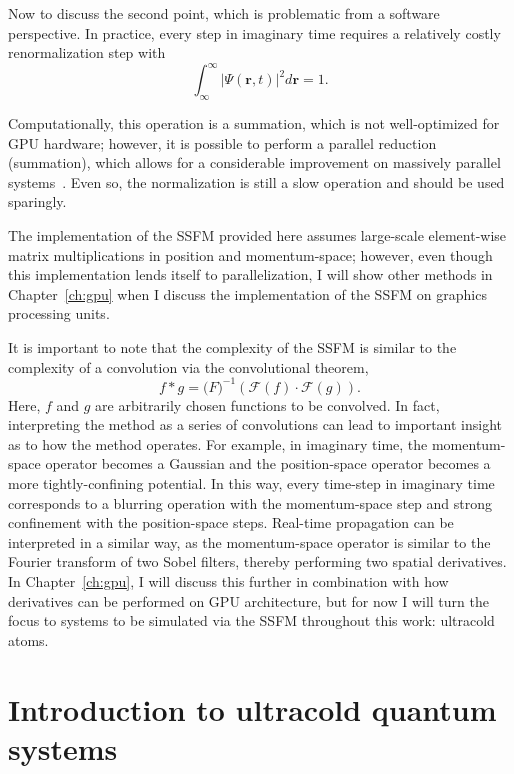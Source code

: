Now to discuss the second point, which is problematic from a software perspective.
In practice, every step in imaginary time requires a relatively costly renormalization step with
\begin{equation}
    \label{eqn:norm}
    \int_\infty^\infty |\Psi(\mathbf{r},t)|^2 d\mathbf{r} = 1.
\end{equation}

\noindent Computationally, this operation is a summation, which is not well-optimized for GPU hardware; however, it is possible to perform a parallel reduction (summation), which allows for a considerable improvement on massively parallel systems~\cite{harris2007}.
Even so, the normalization is still a slow operation and should be used sparingly.

The implementation of the SSFM provided here assumes large-scale element-wise matrix multiplications in position and momentum-space; however, even though this implementation lends itself to parallelization, I will show other methods in Chapter~\ref{ch:gpu} when I discuss the implementation of the SSFM on graphics processing units.

It is important to note that the complexity of the SSFM is similar to the complexity of a convolution via the convolutional theorem,
\begin{equation}
f * g = \mathcal(F)^{-1}\left(\mathcal{F}(f)\cdot\mathcal{F}(g)\right).
\end{equation}
Here, $f$ and $g$ are arbitrarily chosen functions to be convolved.
In fact, interpreting the method as a series of convolutions can lead to important insight as to how the method operates.
For example, in imaginary time, the momentum-space operator becomes a Gaussian and the position-space operator becomes a more tightly-confining potential.
In this way, every time-step in imaginary time corresponds to a blurring operation with the momentum-space step and strong confinement with the position-space steps.
Real-time propagation can be interpreted in a similar way, as the momentum-space operator is similar to the Fourier transform of two Sobel filters, thereby performing two spatial derivatives.
In Chapter~\ref{ch:gpu}, I will discuss this further in combination with how derivatives can be performed on GPU architecture, but for now
I will turn the focus to systems to be simulated via the SSFM throughout this work: ultracold atoms.

\section{Introduction to ultracold quantum systems}
\label{sec:intro}

